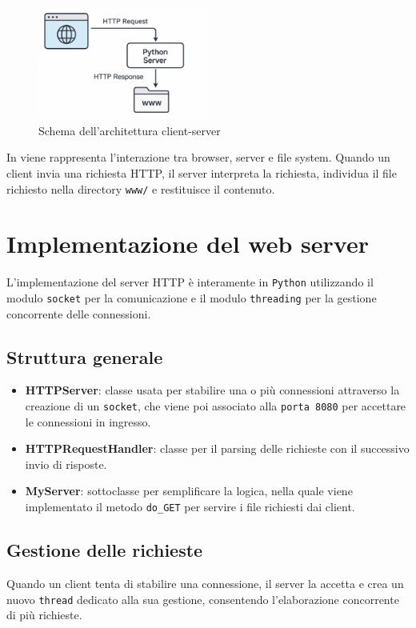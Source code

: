 \documentclass[a4paper,12pt]{report}
\begin{document}
\begin{figure}[H]
    \centering
    \includegraphics[width=0.5\textwidth]{img/architettura.png}
    \caption{Schema dell'architettura client-server}
    \label{fig:architettura}
\end{figure}

In  viene rappresenta l'interazione tra browser, server e file system. Quando un client
invia una richiesta HTTP, il server interpreta la richiesta, individua il file richiesto nella directory \texttt{www/}
e restituisce il contenuto.


\chapter{Implementazione del web server}
L'implementazione del server HTTP è interamente in \texttt{Python} utilizzando il modulo \texttt{socket} per
la comunicazione e il modulo \texttt{threading} per la gestione concorrente delle connessioni.

\section{Struttura generale}
\begin{itemize}
    \item \textbf{HTTPServer}: classe usata per stabilire una o più connessioni \newline attraverso la creazione di
          un \texttt{socket}, che viene poi associato alla \texttt{porta 8080} per accettare le connessioni in ingresso.
    \item \textbf{HTTPRequestHandler}: classe per il parsing delle richieste con il successivo invio di risposte.
    \item \textbf{MyServer}: sottoclasse per semplificare la logica, nella quale viene implementato il
          metodo \texttt{do\_GET} per servire i file richiesti dai client.
\end{itemize}


\section{Gestione delle richieste}
Quando un client tenta di stabilire una connessione, il server la accetta e crea un nuovo \texttt{thread} dedicato alla sua gestione,
consentendo l'elaborazione concorrente di più richieste.
\end{document}
